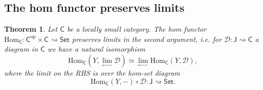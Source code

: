 \documentclass[a4paper]{report}
\newcommand{\Hom}{\mathrm{Hom}}
\theoremstyle{definition}
\theoremstyle{plain}
\newtheorem{theorem}{Theorem}[section]
\theoremstyle{remark}
\begin{document}
\subsection{The hom functor preserves limits}
\begin{theorem}
  \label{thm:homfunctorpreserveslimits}
  Let $\mathsf{C}$ be a locally small category. The hom functor $\Hom_{\mathsf{C}}\colon \mathsf{C}^{\mathrm{op}} \times \mathsf{C} \rightsquigarrow \mathsf{Set}$ preserves limits in the second argument, i.e. for $\mathcal{D}\colon \mathsf{J} \rightsquigarrow \mathsf{C}$ a diagram in $\mathsf{C}$ we have a natural isomorphism
  \begin{equation*}
    \Hom_{\mathsf{C}}(Y, \lim_{\leftarrow}\mathcal{D}) \simeq \lim_{\leftarrow}\Hom_{\mathsf{C}}(Y, \mathcal{D}),
  \end{equation*}
  where the limit on the RHS is over the hom-set diagram
  \begin{equation*}
    \Hom_{\mathsf{C}}(Y, -) \circ \mathcal{D} \colon \mathsf{J} \rightsquigarrow \mathsf{Set}.
  \end{equation*}
\end{theorem}
\end{document}
